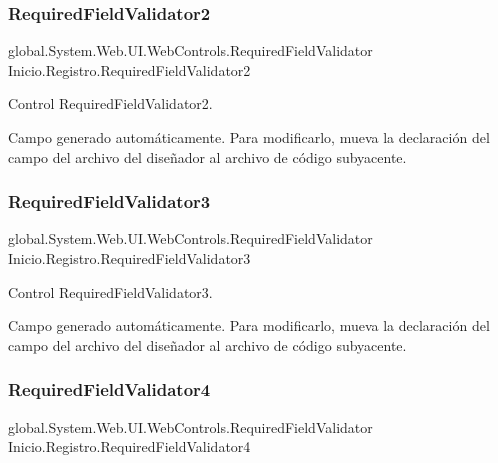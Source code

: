 \subsubsection{\texorpdfstring{RequiredFieldValidator2}{RequiredFieldValidator2}}
{\footnotesize\ttfamily global.\+System.\+Web.\+U\+I.\+Web\+Controls.\+Required\+Field\+Validator Inicio.\+Registro.\+Required\+Field\+Validator2\hspace{0.3cm}{\ttfamily [protected]}}



Control Required\+Field\+Validator2. 

Campo generado automáticamente. Para modificarlo, mueva la declaración del campo del archivo del diseñador al archivo de código subyacente. \mbox{\label{class_inicio_1_1_registro_a24b35dd88cea1b27e18e681d9f1bd24a}} 
\subsubsection{\texorpdfstring{RequiredFieldValidator3}{RequiredFieldValidator3}}
{\footnotesize\ttfamily global.\+System.\+Web.\+U\+I.\+Web\+Controls.\+Required\+Field\+Validator Inicio.\+Registro.\+Required\+Field\+Validator3\hspace{0.3cm}{\ttfamily [protected]}}



Control Required\+Field\+Validator3. 

Campo generado automáticamente. Para modificarlo, mueva la declaración del campo del archivo del diseñador al archivo de código subyacente. \mbox{\label{class_inicio_1_1_registro_a50ab8ab72bcd7c32903c8af8acb766ea}} 
\subsubsection{\texorpdfstring{RequiredFieldValidator4}{RequiredFieldValidator4}}
{\footnotesize\ttfamily global.\+System.\+Web.\+U\+I.\+Web\+Controls.\+Required\+Field\+Validator Inicio.\+Registro.\+Required\+Field\+Validator4\hspace{0.3cm}{\ttfamily [protected]}}



